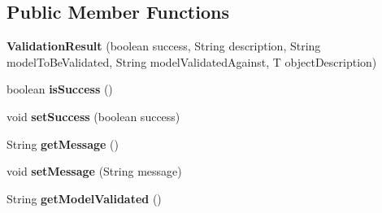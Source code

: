 \subsection*{Public Member Functions}
\begin{DoxyCompactItemize}
\item 
\mbox{\label{classeu_1_1h2020_1_1symbiote_1_1core_1_1internal_1_1ValidationResult_aeb4d6ffcff4b514ad044e735c9967673}} 
{\bfseries Validation\+Result} (boolean success, String description, String model\+To\+Be\+Validated, String model\+Validated\+Against, T object\+Description)
\item 
\mbox{\label{classeu_1_1h2020_1_1symbiote_1_1core_1_1internal_1_1ValidationResult_ad4fe1ba79b85e4095472b92ab15c5ca8}} 
boolean {\bfseries is\+Success} ()
\item 
\mbox{\label{classeu_1_1h2020_1_1symbiote_1_1core_1_1internal_1_1ValidationResult_a95e7fb475688f5539954cbc835038d62}} 
void {\bfseries set\+Success} (boolean success)
\item 
\mbox{\label{classeu_1_1h2020_1_1symbiote_1_1core_1_1internal_1_1ValidationResult_aaaba8ef3136a8dbaecc5d20197bd351d}} 
String {\bfseries get\+Message} ()
\item 
\mbox{\label{classeu_1_1h2020_1_1symbiote_1_1core_1_1internal_1_1ValidationResult_a70b0cca95e297c1f911514ab442f8f10}} 
void {\bfseries set\+Message} (String message)
\item 
\mbox{\label{classeu_1_1h2020_1_1symbiote_1_1core_1_1internal_1_1ValidationResult_a2adc7904555fc5d9e6e282777bec6947}} 
String {\bfseries get\+Model\+Validated} ()
\item 
\mbox{\label{classeu_1_1h2020_1_1symbiote_1_1core_1_1internal_1_1ValidationResult_a9c15e5561696f5e3cb8eacfd7da5cc25}} 

\end{DoxyCompactItemize}
